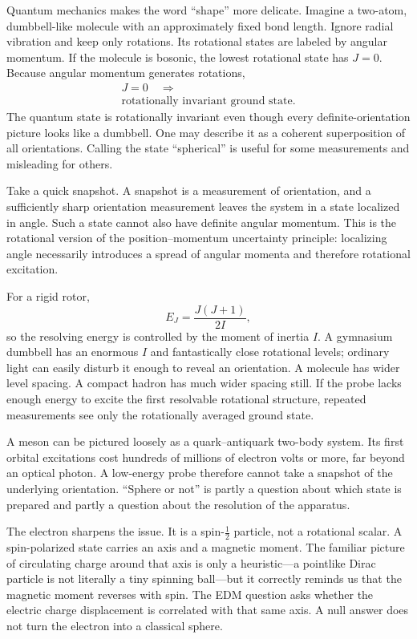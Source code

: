 Quantum mechanics makes the word ``shape'' more delicate. Imagine a two-atom, dumbbell-like molecule with an approximately fixed bond length. Ignore radial vibration and keep only rotations. Its rotational states are labeled by angular momentum. If the molecule is bosonic, the lowest rotational state has \(J=0\). Because angular momentum generates rotations,
\begin{equation}
\begin{gathered}
J=0 \quad\Longrightarrow\\
\text{rotationally invariant ground state.}
\end{gathered}
\end{equation}
The quantum state is rotationally invariant even though every
definite-orientation picture looks like a dumbbell. One may describe it as a
coherent superposition of all orientations. Calling the state ``spherical''
is useful for some measurements and misleading for others.

Take a quick snapshot. A snapshot is a measurement of orientation, and a sufficiently sharp orientation measurement leaves the system in a state localized in angle. Such a state cannot also have definite angular momentum. This is the rotational version of the position--momentum uncertainty principle: localizing angle necessarily introduces a spread of angular momenta and therefore rotational excitation.

For a rigid rotor,
\begin{equation}
E_J=\frac{J(J+1)}{2I},
\end{equation}
so the resolving energy is controlled by the moment of inertia \(I\). A gymnasium dumbbell has an enormous \(I\) and fantastically close rotational levels; ordinary light can easily disturb it enough to reveal an orientation. A molecule has wider level spacing. A compact hadron has much wider spacing still. If the probe lacks enough energy to excite the first resolvable rotational structure, repeated measurements see only the rotationally averaged ground state.

A meson can be pictured loosely as a quark--antiquark two-body system. Its first orbital excitations cost hundreds of millions of electron volts or more, far beyond an optical photon. A low-energy probe therefore cannot take a snapshot of the underlying orientation. ``Sphere or not'' is partly a question about which state is prepared and partly a question about the resolution of the apparatus.

The electron sharpens the issue. It is a spin-\(\tfrac12\) particle, not a rotational scalar. A spin-polarized state carries an axis and a magnetic moment. The familiar picture of circulating charge around that axis is only a heuristic---a pointlike Dirac particle is not literally a tiny spinning ball---but it correctly reminds us that the magnetic moment reverses with spin. The EDM question asks whether the electric charge displacement is correlated with that same axis. A null answer does not turn the electron into a classical sphere.

